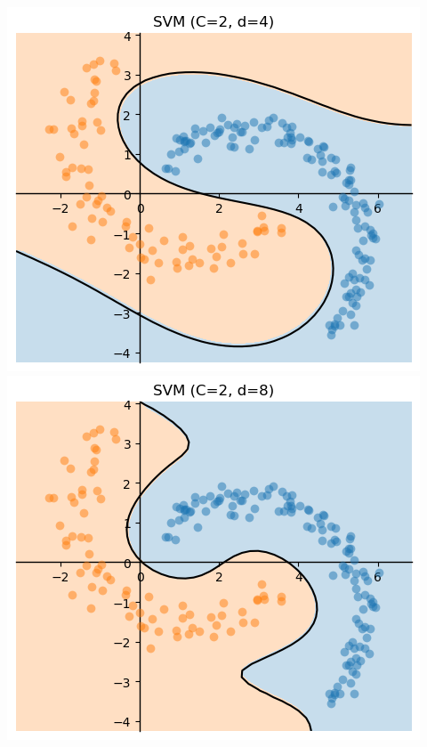 \documentclass[10pt,aspectratio=169,handout]{beamer}
\begin{document}
\begin{frame}
\begin{columns}
\begin{column}{0.3\textwidth}
            \centering
            \includegraphics[height=0.4\textheight]{images/task5-4-d_4.png}
            \includegraphics[height=0.4\textheight]{images/task5-4-d_8.png}
        \end{column}    
        \begin{column}{0.3\textwidth}
            \centering

\end{column}
\end{columns}
\end{frame}
\end{document}
